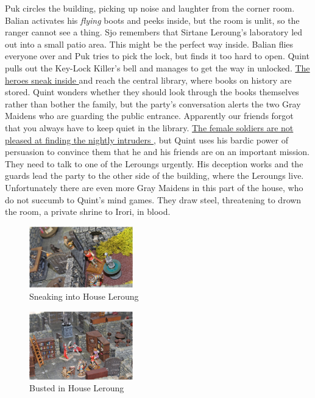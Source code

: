 Puk circles the building, picking up noise and laughter from the corner room. Balian activates his {\itshape flying} boots and peeks inside, but the room is unlit, so the ranger cannot see a thing. Sjo remembers that Sirtane Leroung's laboratory led out into a small patio area. This might be the perfect way inside. Balian flies everyone over and Puk tries to pick the lock, but finds it too hard to open. Quint pulls out the Key-Lock Killer's bell and manages to get the way in unlocked. \hyperref[fig:Sneaking-into-House-Leroung-607544485]{ The heroes sneak inside } and reach the central library, where books on history are stored. Quint wonders whether they should look through the books themselves rather than bother the family, but the party's conversation alerts the two Gray Maidens who are guarding the public entrance. Apparently our friends forgot that you always have to keep quiet in the library. \hyperref[fig:Busted-in-House-Leroung-607546219]{ The female soldiers are not pleased at finding the nightly intruders } , but Quint uses his bardic power of persuasion to convince them that he and his friends are on an important mission. They need to talk to one of the Leroungs urgently. His deception works and the guards lead the party to the other side of the building, where the Leroungs live. Unfortunately there are even more Gray Maidens in this part of the house, who do not succumb to Quint's mind games. They draw steel, threatening to drown the room, a private shrine to Irori, in blood. \\

\begin{figure}[h]
	\centering
	\includegraphics[width=0.4\textwidth]{images/Sneaking-into-House-Leroung-607544485_mod.jpg}
	\caption{Sneaking into House Leroung}
	\label{fig:Sneaking-into-House-Leroung-607544485}
\end{figure}

\begin{figure}[h]
	\centering
	\includegraphics[width=0.4\textwidth]{images/Busted-in-House-Leroung-607546219_mod.jpg}
	\caption{Busted in House Leroung}
	\label{fig:Busted-in-House-Leroung-607546219}
\end{figure}


